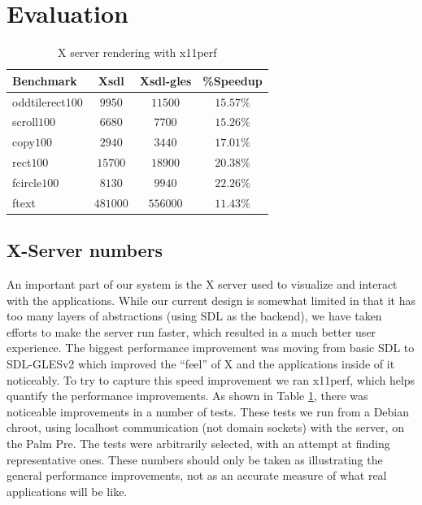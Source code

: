 \section{Evaluation}
\label{sec:eval}

\begin{table}[ht]
{\small
\hfill{}
\begin{tabular}{|l|c|c|c|}
\hline Benchmark & Xsdl & Xsdl-gles & \%Speedup \\ [2pt] 
\hline oddtilerect$100$ & $9950$ & $11500$ & $15.57\%$ \\ [2pt]
scroll$100$ & $6680$ & $7700$ & $15.26\%$ \\ [2pt]
copy$100$ & $2940$ & $3440$ & $17.01\%$ \\ [2pt]
rect$100$ & $15700$ & $18900$ & $20.38\%$ \\ [2pt]
fcircle$100$ & $8130$ & $9940$ & $22.26\%$ \\ [2pt]
ftext & $481000$ & $556000$ & $11.43\%$ \\ [2pt]
\hline 
\end{tabular}}
\hfill{}
\caption{ X server rendering with x11perf }
\label{tab:x_results}
\end{table}

\subsection{X-Server numbers}
\label{sec:x_eval}

An important part of our system is the X server used to visualize and interact with the applications.  While our current design is somewhat limited in that it has too many layers of abstractions (using SDL as the backend), we have taken efforts to make the server run faster, which resulted in a much better user experience.  The biggest  performance improvement was moving from basic SDL to SDL-GLESv2 which improved the ``feel'' of X and the applications inside of it noticeably.  To try to capture this speed improvement we ran x11perf, which helps quantify the performance improvements.  As shown in Table \ref{tab:x_results}, there was noticeable improvements in a number of tests.
These tests we run from a Debian chroot, using localhost communication (not domain sockets) with the server, on the Palm Pre.  The tests were arbitrarily selected, with an attempt at finding representative ones.  These numbers should only be taken as illustrating the general performance improvements, not as an accurate measure of what real applications will be like.

